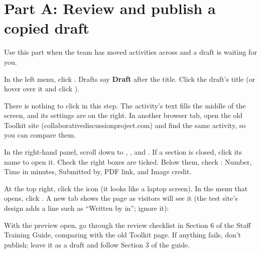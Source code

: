 \newpage
\section*{Part A: Review and publish a copied draft}
\setcounter{wstep}{0}
Use this part when the team has moved activities across and a draft is waiting for you.

In the left menu, click . Drafts say \textbf{Draft} after the title. Click the draft's title (or hover over it and click ).

There is nothing to click in this step. The activity's text fills the middle of the screen, and its settings are on the right. In another browser tab, open the old Toolkit site (collaborativediscussionproject.com) and find the same activity, so you can compare them.

In the right-hand panel, scroll down to , , and . If a section is closed, click its name to open it. Check the right boxes are ticked. Below them, check : Number, Time in minutes, Submitted by, PDF link, and Image credit.

At the top right, click the  icon (it looks like a laptop screen). In the menu that opens, click .
A new tab shows the page as visitors will see it (the test site's design adds a line such as ``Written by in''; ignore it):

With the preview open, go through the review checklist in Section 6 of the Staff Training Guide, comparing with the old Toolkit page. If anything fails, don't publish; leave it as a draft and follow Section 3 of the guide.

